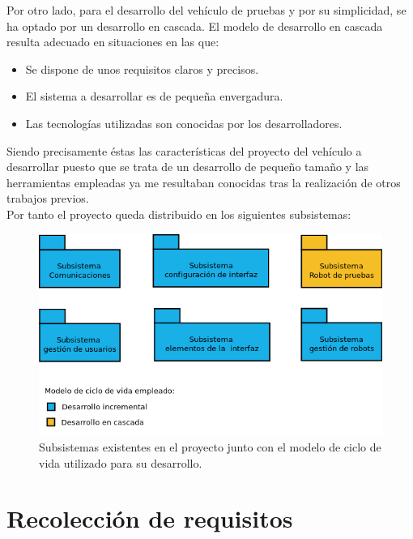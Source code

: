 Por otro lado, para el desarrollo del vehículo de pruebas y por su simplicidad, se ha optado por un desarrollo en cascada. El modelo de desarrollo en cascada resulta adecuado en situaciones
en las que:\\

\begin{itemize}
 \item Se dispone de unos requisitos claros y precisos.
 \item El sistema a desarrollar es de pequeña envergadura.
 \item Las tecnologías utilizadas son conocidas por los desarrolladores.
\end{itemize}

Siendo precisamente éstas las características del proyecto del vehículo a desarrollar puesto que se trata de un desarrollo de pequeño tamaño y las herramientas empleadas ya me resultaban conocidas
tras la realización de otros trabajos previos.\\

Por tanto el proyecto queda distribuido en los siguientes subsistemas:\\

\begin{figure}[H]
  \begin{center}
    \includegraphics[scale=.6]{diagramas/subsistemas.png}
  \end{center}
  \caption{Subsistemas existentes en el proyecto junto con el modelo de ciclo de vida
utilizado para su desarrollo.}
  \label{website:pagina-principal}
\end{figure}


\section{Recolección de requisitos}

